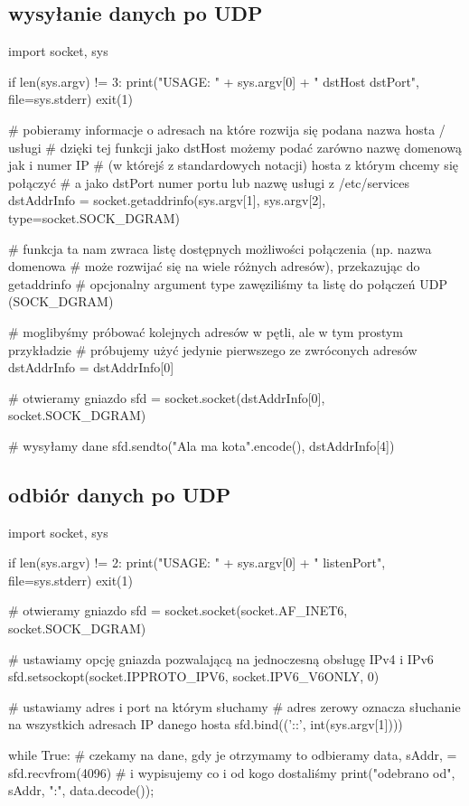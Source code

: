\subsection{wysyłanie danych po UDP}
\begin{CodeFrame*}[python]{}
import socket, sys

if len(sys.argv) != 3:
  print("USAGE: " + sys.argv[0] + " dstHost dstPort", file=sys.stderr)
  exit(1)

# pobieramy informacje o adresach na które rozwija się podana nazwa hosta / usługi
# dzięki tej funkcji jako dstHost możemy podać zarówno nazwę domenową jak i numer IP 
# (w którejś z standardowych notacji) hosta z którym chcemy się połączyć
# a jako dstPort numer portu lub nazwę usługi z /etc/services
dstAddrInfo = socket.getaddrinfo(sys.argv[1], sys.argv[2], type=socket.SOCK_DGRAM)

# funkcja ta nam zwraca listę dostępnych możliwości połączenia (np. nazwa domenowa
# może rozwijać się na wiele różnych adresów), przekazując do getaddrinfo
# opcjonalny argument type zawęziliśmy ta listę do połączeń UDP (SOCK_DGRAM)

# moglibyśmy próbować kolejnych adresów w pętli, ale w tym prostym przykładzie
# próbujemy użyć jedynie pierwszego ze zwróconych adresów
dstAddrInfo = dstAddrInfo[0]

# otwieramy gniazdo
sfd = socket.socket(dstAddrInfo[0], socket.SOCK_DGRAM)

# wysyłamy dane
sfd.sendto("Ala ma kota".encode(), dstAddrInfo[4])
\end{CodeFrame*}


\subsection{odbiór danych po UDP}
\begin{CodeFrame*}[python]{}
import socket, sys

if len(sys.argv) != 2:
  print("USAGE: " + sys.argv[0] + " listenPort", file=sys.stderr)
  exit(1)

# otwieramy gniazdo
sfd = socket.socket(socket.AF_INET6, socket.SOCK_DGRAM)

# ustawiamy opcję gniazda pozwalającą na jednoczesną obsługę IPv4 i IPv6
sfd.setsockopt(socket.IPPROTO_IPV6, socket.IPV6_V6ONLY, 0)

# ustawiamy adres i port na którym słuchamy
# adres zerowy oznacza słuchanie na wszystkich adresach IP danego hosta
sfd.bind(('::', int(sys.argv[1])))

while True:
  # czekamy na dane, gdy je otrzymamy to odbieramy
  data, sAddr, = sfd.recvfrom(4096)
  # i wypisujemy co i od kogo dostaliśmy
  print("odebrano od", sAddr, ":", data.decode());
\end{CodeFrame*}

